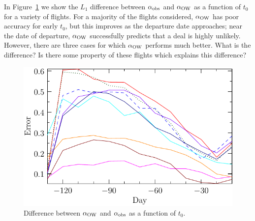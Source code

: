 \documentclass{article}
\def\aow{\alpha_{\rm{OW}}}
\def\aobs{\alpha_{\rm{obs}}}
\begin{document}
In Figure~\ref{plotA0} we show the $L_1$ difference between $\aobs$ and
$\aow$ as a function of $t_0$ for a variety of flights.  For a
majority of the flights considered, $\aow$ has poor accuracy for early
$t_0$, but this improves as the departure date approaches; near the
date of departure, $\aow$ successfully predicts that a deal is highly
unlikely.  However, there are three cases for which $\aow$ performs
much better.  What is the difference?  Is there some property of these
flights which explains this difference?
\begin{figure}
  \begin{center}
    \includegraphics{pdf/plotA0}
    \caption{Difference between $\alpha_{\rm{OW}}$ and
      $\alpha_{\rm{obs}}$ as a function of $t_0$.}
    \label{plotA0}
  \end{center}
\end{figure}
\end{document}
